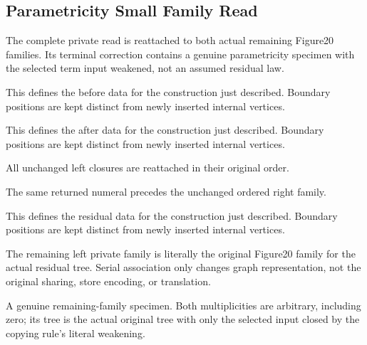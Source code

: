\subsection{Parametricity Small Family Read}
The complete private read is reattached to both actual remaining Figure20 families. Its terminal correction contains a genuine parametricity specimen with the selected term input weakened, not an assumed residual law.

This defines the before data for the construction just described. Boundary positions are kept distinct from newly inserted internal vertices.
\par{}

This defines the after data for the construction just described. Boundary positions are kept distinct from newly inserted internal vertices.
\par{}

All unchanged left closures are reattached in their original order.
\par{}

The same returned numeral precedes the unchanged ordered right family.
\par{}

This defines the residual data for the construction just described. Boundary positions are kept distinct from newly inserted internal vertices.
\par{}

The remaining left private family is literally the original Figure20 family for the actual residual tree. Serial association only changes graph representation, not the original sharing, store encoding, or translation.
\par{}

A genuine remaining-family specimen. Both multiplicities are arbitrary, including zero; its tree is the actual original tree with only the selected input closed by the copying rule's literal weakening.
\par{}

